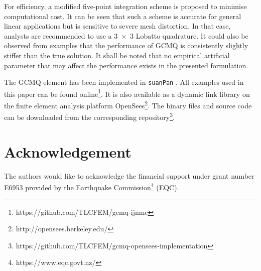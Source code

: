 \documentclass[3p,sort&compress,review,11pt]{elsarticle}
\begin{document}
For efficiency, a modified five-point integration scheme is proposed to minimise computational cost. It can be seen that such a scheme is accurate for general linear applications but is sensitive to severe mesh distortion. In that case, analysts are recommended to use a \num{3x3} Lobatto quadrature. It could also be observed from examples that the performance of GCMQ is consistently slightly stiffer than the true solution. It shall be noted that no empirical artificial parameter that may affect the performance exists in the presented formulation.

The GCMQ element has been implemented in \texttt{suanPan} \citep{Chang2018}. All examples used in this paper can be found online\footnote{https://github.com/TLCFEM/gcmq-ijnme}. It is also available as a dynamic link library on the finite element analysis platform OpenSees\footnote{http://opensees.berkeley.edu/}. The binary files and source code can be downloaded from the corresponding repository\footnote{https://github.com/TLCFEM/gcmq-opensees-implementation}.
\section*{Acknowledgement}
The authors would like to acknowledge the financial support under grant number E6953 provided by the Earthquake Commission\footnote{https://www.eqc.govt.nz/} (EQC).

\end{document}
